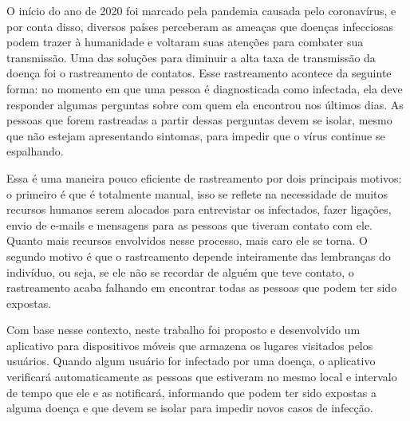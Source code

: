 \documentclass[Portugues,Final]{tese-FT}
\begin{document}
\begin{resumo}
O início do ano de 2020 foi marcado pela pandemia causada pelo coronavírus, e por conta disso, diversos países perceberam as ameaças que doenças infecciosas podem trazer à humanidade e voltaram suas atenções para combater sua transmissão. 
Uma das soluções para diminuir a alta taxa de transmissão da doença foi o rastreamento de contatos. Esse rastreamento acontece da seguinte forma: no momento em que uma pessoa é diagnosticada como infectada, ela deve responder algumas perguntas sobre com quem ela encontrou nos últimos dias. As pessoas que forem rastreadas a partir dessas perguntas devem se isolar, mesmo que não estejam apresentando sintomas, para impedir que o vírus continue se espalhando.

Essa é uma maneira pouco eficiente de rastreamento por dois principais motivos: o primeiro é que é totalmente manual, isso se reflete na necessidade de muitos recursos humanos serem alocados para entrevistar os infectados, fazer ligações, envio de e-mails e mensagens para as pessoas que tiveram contato com ele. Quanto mais recursos envolvidos nesse processo, mais caro ele se torna. O segundo motivo é que o rastreamento depende inteiramente das lembranças do indivíduo, ou seja, se ele não se recordar de alguém que teve contato, o rastreamento acaba falhando em encontrar todas as pessoas que podem ter sido expostas.

Com base nesse contexto, neste trabalho foi proposto e desenvolvido um aplicativo para dispositivos móveis que armazena os lugares visitados pelos usuários. Quando algum usuário for infectado por uma doença, o aplicativo verificará automaticamente as pessoas que estiveram no mesmo local e intervalo de tempo que ele e as notificará, informando que podem ter sido expostas a alguma doença e que devem se isolar para impedir novos casos de infecção.
\end{resumo}
\end{document}
